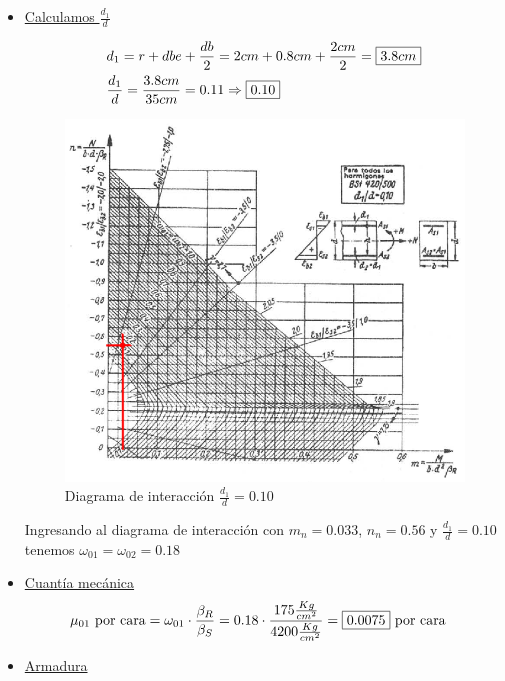 \begin{enumerate}
\begin{itemize}
\item \underline{Calculamos $\frac{d_1}{d}$}

\begin{align*}
& d_1 = r + dbe + \frac{db}{2} = 2cm + 0.8cm + \frac{2cm}{2} =  \framebox{$3.8cm$}\\
& \frac{d_1}{d} = \frac{3.8cm}{35cm} = 0.11 \Rightarrow \framebox{0.10}
\end{align*}

\begin{figure}[H]
\begin{center}
	 \includegraphics[scale = 0.9]{chapters/chapter_1/images/figura3.png}
     \caption{Diagrama de interacción $\frac{d_1}{d} = 0.10$}
\end{center}
\end{figure}
Ingresando al diagrama de interacción con $m_{n}=0.033$, $n_{n}=0.56$ y $\frac{d_1}{d} = 0.10$ tenemos $\omega_{01} = \omega_{02} = 0.18$

\item \underline{Cuantía mecánica}
\begin{align*}
& \mu_{01} \text{ por cara} = \omega_{01} \cdot \frac{\beta_R}{\beta_S} = 0.18 \cdot \frac{175 \frac{Kg}{cm^2}}{4200 \frac{Kg}{cm^2}} = \framebox{0.0075} \text{ por cara}
\end{align*}

\item \underline{Armadura}


\end{itemize}
\end{enumerate}
